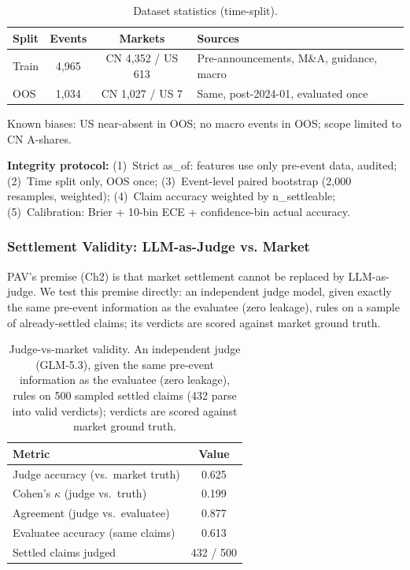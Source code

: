 \documentclass[sigconf, anonymous, review]{acmart}
\begin{document}
\begin{table}[t]
\centering\footnotesize
\caption{Dataset statistics (time-split).}
\label{tab:dataset}
\setlength{\tabcolsep}{4pt}
\begin{tabular}{@{}lccp{2.9cm}@{}}
\toprule
Split & Events & Markets & Sources \\
\midrule
Train & 4,965 & CN 4,352 / US 613 & Pre-announcements, M\&A, guidance, macro \\
OOS & 1,034 & CN 1,027 / US 7 & Same, post-2024-01, evaluated once \\
\bottomrule
\end{tabular}
\end{table}

Known biases: US near-absent in OOS; no macro events in OOS; scope limited to CN A-shares.

\textbf{Integrity protocol:} (1)~Strict as\_of: features use only pre-event data, audited; (2)~Time split only, OOS once; (3)~Event-level paired bootstrap (2,000 resamples, weighted); (4)~Claim accuracy weighted by n\_settleable; (5)~Calibration: Brier + 10-bin ECE + confidence-bin actual accuracy.

\subsubsection{Settlement Validity: LLM-as-Judge vs. Market}
\label{sec:judgevalidity}

PAV's premise (Ch2) is that market settlement cannot be replaced by LLM-as-judge. We test this premise directly: an independent judge model, given exactly the same pre-event information as the evaluatee (zero leakage), rules on a sample of already-settled claims; its verdicts are scored against market ground truth.

\begin{table}[t]
\centering\small
\caption{Judge-vs-market validity. An independent judge (GLM-5.3), given the same pre-event information as the evaluatee (zero leakage), rules on 500 sampled settled claims (432 parse into valid verdicts); verdicts are scored against market ground truth.}
\label{tab:judge}
\begin{tabular}{@{}lc@{}}
\toprule
Metric & Value \\
\midrule
Judge accuracy (vs.\ market truth) & 0.625 \\
Cohen's $\kappa$ (judge vs.\ truth) & 0.199 \\
Agreement (judge vs.\ evaluatee) & 0.877 \\
Evaluatee accuracy (same claims) & 0.613 \\
Settled claims judged & 432 / 500 \\
\bottomrule
\end{tabular}
\end{table}
\end{document}
